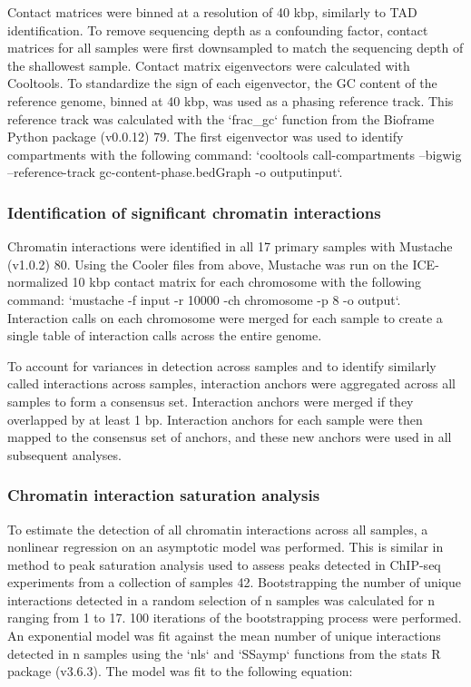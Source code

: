 Contact matrices were binned at a resolution of 40 kbp, similarly to TAD identification.
To remove sequencing depth as a confounding factor, contact matrices for all samples were first downsampled to match the sequencing depth of the shallowest sample.
Contact matrix eigenvectors were calculated with Cooltools.
To standardize the sign of each eigenvector, the GC content of the reference genome, binned at 40 kbp, was used as a phasing reference track.
This reference track was calculated with the `frac_gc` function from the Bioframe Python package (v0.0.12) 79.
The first eigenvector was used to identify compartments with the following command: `cooltools call-compartments --bigwig --reference-track gc-content-phase.bedGraph -o {output}{input}`.

\subsubsection{Identification of significant chromatin interactions}

Chromatin interactions were identified in all 17 primary samples with Mustache (v1.0.2) 80.
Using the Cooler files from above, Mustache was run on the ICE-normalized 10 kbp contact matrix for each chromosome with the following command: `mustache -f {input} -r 10000 -ch {chromosome} -p 8 -o {output}`.
Interaction calls on each chromosome were merged for each sample to create a single table of interaction calls across the entire genome.

To account for variances in detection across samples and to identify similarly called interactions across samples, interaction anchors were aggregated across all samples to form a consensus set.
Interaction anchors were merged if they overlapped by at least 1 bp.
Interaction anchors for each sample were then mapped to the consensus set of anchors, and these new anchors were used in all subsequent analyses.


\subsubsection{Chromatin interaction saturation analysis}

To estimate the detection of all chromatin interactions across all samples, a nonlinear regression on an asymptotic model was performed.
This is similar in method to peak saturation analysis used to assess peaks detected in ChIP-seq experiments from a collection of samples 42.
Bootstrapping the number of unique interactions detected in a random selection of n samples was calculated for n ranging from 1 to 17.
100 iterations of the bootstrapping process were performed.
An exponential model was fit against the mean number of unique interactions detected in n samples using the `nls` and `SSaymp` functions from the stats R package (v3.6.3).
The model was fit to the following equation:

